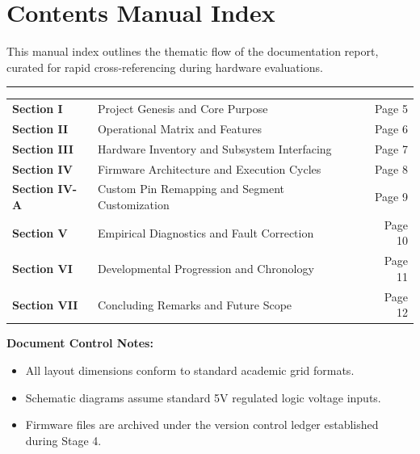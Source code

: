 \documentclass[12pt,letterpaper]{article}
\begin{document}
\clearpage
\section*{Contents Manual Index}

\noindent This manual index outlines the thematic flow of the documentation report, curated for rapid cross-referencing during hardware evaluations.

\vspace{0.5em}
\hrule
\vspace{0.8em}

\begin{tabularx}{\textwidth}{@{}l X r@{}}
  \textbf{Section I} & Project Genesis and Core Purpose & Page 5 \\
  \textbf{Section II} & Operational Matrix and Features & Page 6 \\
  \textbf{Section III} & Hardware Inventory and Subsystem Interfacing & Page 7 \\
  \textbf{Section IV} & Firmware Architecture and Execution Cycles & Page 8 \\
  \textbf{Section IV-A} & Custom Pin Remapping and Segment Customization & Page 9 \\
  \textbf{Section V} & Empirical Diagnostics and Fault Correction & Page 10 \\
  \textbf{Section VI} & Developmental Progression and Chronology & Page 11 \\
  \textbf{Section VII} & Concluding Remarks and Future Scope & Page 12 \\
\end{tabularx}

\vspace{1.5em}
\noindent \textbf{Document Control Notes:} 
\begin{itemize}
  \item All layout dimensions conform to standard academic grid formats.
  \item Schematic diagrams assume standard 5V regulated logic voltage inputs.
  \item Firmware files are archived under the version control ledger established during Stage 4.
\end{itemize}

\clearpage
\end{document}
